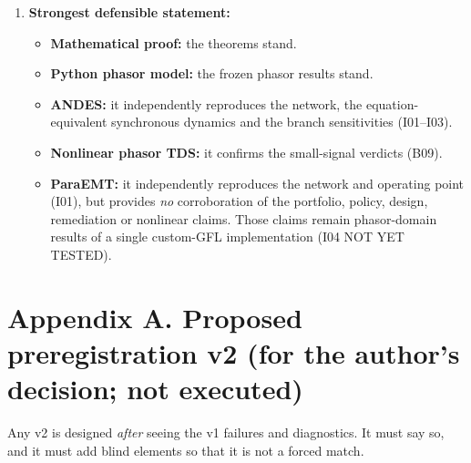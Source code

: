 \documentclass[10pt,a4paper]{article}
\begin{document}
\begin{enumerate}[leftmargin=1.8em]
\begin{itemize}
  \end{itemize}
\item \textbf{Strongest defensible statement:}
  \begin{itemize}
  \item \textbf{Mathematical proof:} the theorems stand.
  \item \textbf{Python phasor model:} the frozen phasor results stand.
  \item \textbf{ANDES:} it independently reproduces the network, the
    equation-equivalent synchronous dynamics and the branch sensitivities
    (I01--I03).
  \item \textbf{Nonlinear phasor TDS:} it confirms the small-signal verdicts
    (B09).
  \item \textbf{ParaEMT:} it independently reproduces the network and
    operating point (I01), but provides \emph{no} corroboration of the
    portfolio, policy, design, remediation or nonlinear claims. Those claims
    remain phasor-domain results of a single custom-GFL implementation (I04
    NOT YET TESTED).
  \end{itemize}
\end{enumerate}

\section*{Appendix A. Proposed preregistration v2 (for the author's decision; not executed)}\label{app:v2}

Any v2 is designed \emph{after} seeing the v1 failures and diagnostics. It must
say so, and it must add blind elements so that it is not a forced match.
\end{document}
